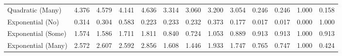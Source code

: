 \begin{table}[htbp]
{\begin{tabular}{|l|cccc|cccc|cccc|}
Quadratic (Many) & \cellcolor[RGB]{242,255,0}4.376 & \cellcolor[RGB]{255,58,0}4.579 & \cellcolor[RGB]{0,255,0}4.141 & \cellcolor[RGB]{255,0,0}4.636 & \cellcolor[RGB]{255,0,0}3.314 & \cellcolor[RGB]{12,255,0}3.060 & \cellcolor[RGB]{255,224,0}3.200 & \cellcolor[RGB]{0,255,0}3.054 & \cellcolor[RGB]{255,53,0}0.246 & \cellcolor[RGB]{255,53,0}0.246 & \cellcolor[RGB]{0,255,0}1.000 & \cellcolor[RGB]{255,0,0}0.158 \\
Exponential (No) & \cellcolor[RGB]{128,255,0}0.314 & \cellcolor[RGB]{114,255,0}0.304 & \cellcolor[RGB]{255,0,0}0.583 & \cellcolor[RGB]{0,255,0}0.223 & \cellcolor[RGB]{146,255,0}0.233 & \cellcolor[RGB]{142,255,0}0.232 & \cellcolor[RGB]{255,0,0}0.373 & \cellcolor[RGB]{0,255,0}0.177 & \cellcolor[RGB]{255,8,0}0.017 & \cellcolor[RGB]{255,8,0}0.017 & \cellcolor[RGB]{255,0,0}0.000 & \cellcolor[RGB]{0,255,0}1.000 \\
Exponential (Some) & \cellcolor[RGB]{0,255,0}1.574 & \cellcolor[RGB]{25,255,0}1.586 & \cellcolor[RGB]{255,215,0}1.711 & \cellcolor[RGB]{255,0,0}1.811 & \cellcolor[RGB]{180,255,0}0.840 & \cellcolor[RGB]{0,255,0}0.724 & \cellcolor[RGB]{255,0,0}1.053 & \cellcolor[RGB]{255,253,0}0.889 & \cellcolor[RGB]{255,0,0}0.913 & \cellcolor[RGB]{255,0,0}0.913 & \cellcolor[RGB]{0,255,0}1.000 & \cellcolor[RGB]{255,0,0}0.913 \\
Exponential (Many) & \cellcolor[RGB]{0,255,0}2.572 & \cellcolor[RGB]{62,255,0}2.607 & \cellcolor[RGB]{35,255,0}2.592 & \cellcolor[RGB]{255,0,0}2.856 & \cellcolor[RGB]{169,255,0}1.608 & \cellcolor[RGB]{0,255,0}1.446 & \cellcolor[RGB]{255,0,0}1.933 & \cellcolor[RGB]{255,194,0}1.747 & \cellcolor[RGB]{208,255,0}0.765 & \cellcolor[RGB]{224,255,0}0.747 & \cellcolor[RGB]{0,255,0}1.000 & \cellcolor[RGB]{255,0,0}0.424 \\
\hline
\end{tabular}
}%
\end{table}
